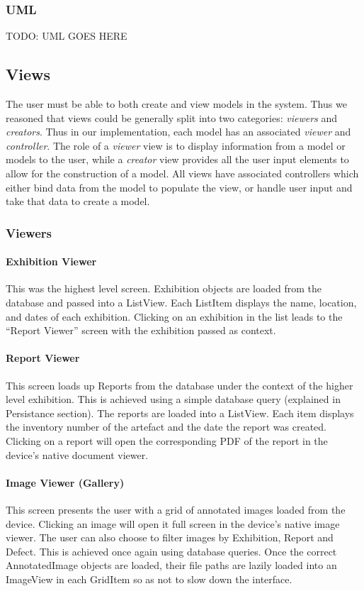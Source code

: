 \documentclass[12pt]{article}
\begin{document}
\subsubsection{UML}
TODO: UML GOES HERE

\subsection{Views}
The user must be able to both create and view models in the system. Thus we reasoned that views could be generally split into two categories: \textit{viewers} and \textit{creators}. Thus in our implementation, each model has an associated \textit{viewer} and \textit{controller}. The role of a  \textit{viewer} view is to display information from a model or models to the user, while a \textit{creator} view provides all the user input elements to allow for the construction of a model. All views have associated controllers which either bind data from the model to populate the view, or handle user input and take that data to create a model.


\subsubsection{Viewers}
\label{sec:Viewers}

\paragraph{Exhibition Viewer}
This was the highest level screen. Exhibition objects are loaded from the database and passed into a ListView. Each ListItem displays the name, location, and dates of each exhibition. Clicking on an exhibition in the list leads to the ``Report Viewer'' screen with the exhibition passed as context.

\paragraph{Report Viewer}
This screen loads up Reports from the database under the context of the higher level exhibition. This is achieved using a simple database query (explained in Persistance section). The reports are loaded into a ListView. Each item displays the inventory number of the artefact and the date the report was created. Clicking on a report will open the corresponding PDF of the report in the device's native document viewer.

\paragraph{Image Viewer (Gallery)}
This screen presents the user with a grid of annotated images loaded from the device. Clicking an image will open it full screen in the device's native image viewer. The user can also choose to filter images by Exhibition, Report and Defect. This is achieved once again using database queries. Once the correct AnnotatedImage objects are loaded, their file paths are lazily loaded into an ImageView in each GridItem so as not to slow down the interface. 
\end{document}
